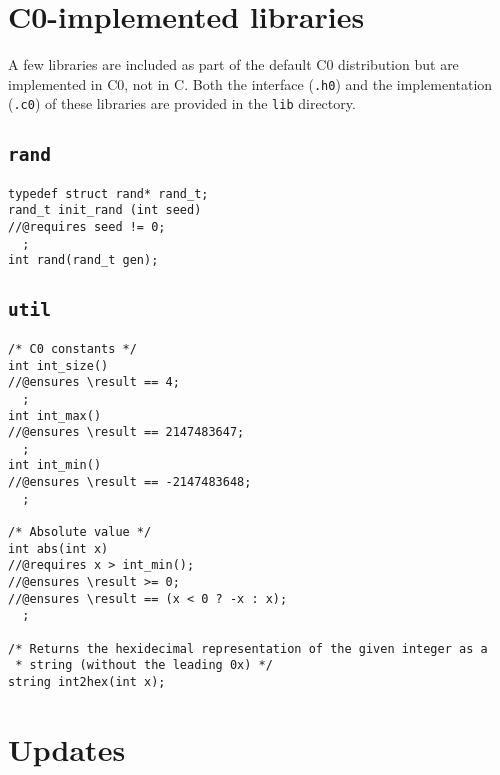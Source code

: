 \documentclass[11pt]{article}
\begin{document}
\section{C0-implemented libraries}

A few libraries are included as part of the default C0 distribution
but are implemented in C0, not in C. Both the interface (\verb'.h0')
and the implementation (\verb'.c0') of these libraries are provided in
the \verb'lib' directory.

\subsection{\tt rand}

\begin{small}
\begin{verbatim}
typedef struct rand* rand_t;
rand_t init_rand (int seed)
//@requires seed != 0;
  ;
int rand(rand_t gen);
\end{verbatim}
\end{small}

\subsection{\tt util}

\begin{small}
\begin{verbatim}
/* C0 constants */
int int_size()
//@ensures \result == 4;
  ;
int int_max()
//@ensures \result == 2147483647;
  ;
int int_min()
//@ensures \result == -2147483648;
  ;

/* Absolute value */
int abs(int x)
//@requires x > int_min();
//@ensures \result >= 0;
//@ensures \result == (x < 0 ? -x : x);
  ;

/* Returns the hexidecimal representation of the given integer as a
 * string (without the leading 0x) */ 
string int2hex(int x);
\end{verbatim}
\end{small}

\section{Updates}
\label{sec:updates}
\hypertarget{sec:updates}{}
\end{document}
